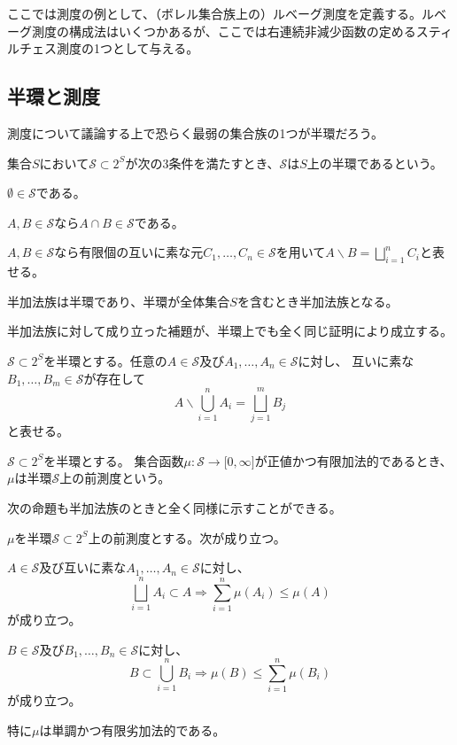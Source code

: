 \documentclass[../root.tex]{subfiles}
\begin{document}
ここでは測度の例として、（ボレル集合族上の）ルベーグ測度を定義する。ルベーグ測度の構成法はいくつかあるが、ここでは右連続非減少函数の定めるスティルチェス測度の1つとして与える。




\subsection{半環と測度}
測度について議論する上で恐らく最弱の集合族の1つが半環だろう。

\begin{Def}{}{}
集合$ S $において$ \mathscr{S}\subset 2^{S} $が次の3条件を満たすとき、$ \mathscr{S} $は$ S $上の半環であるという。
\begin{EnumCond}
\item $ \emptyset\in\mathscr{S} $である。
\item $ A, B\in\mathscr{S} $なら$ A\cap B\in\mathscr{S} $である。
\item $ A, B\in\mathscr{S} $なら有限個の互いに素な元$ C_{1}, \dotsc, C_{n}\in\mathscr{S} $を用いて$ A\backslash B=\bigsqcup_{i=1}^{n}C_{i} $と表せる。
\end{EnumCond}
\end{Def}

半加法族は半環であり、半環が全体集合$ S $を含むとき半加法族となる。

半加法族に対して成り立った補題が、半環上でも全く同じ証明により成立する。

\begin{Lem}{}{}
$ \mathscr{S}\subset 2^{S} $を半環とする。任意の$ A\in\mathscr{S} $及び$ A_{1}, \dotsc, A_{n}\in\mathscr{S} $に対し、
互いに素な$ B_{1}, \dotsc, B_{m}\in\mathscr{S} $が存在して
\[ A\backslash\bigcup_{i=1}^{n}A_{i}=\bigsqcup_{j=1}^{m}B_{j} \]
と表せる。
\end{Lem}

\begin{Def}{}{}
$ \mathscr{S}\subset 2^{S} $を半環とする。
集合函数$ \mu\colon\mathscr{S}\rightarrow\lbrack 0, \infty \rbrack $が正値かつ有限加法的であるとき、$ \mu $は半環$ \mathscr{S} $上の前測度という。
\end{Def}

次の命題も半加法族のときと全く同様に示すことができる。

\begin{Prop}{}{}
$ \mu $を半環$ \mathscr{S}\subset 2^{S} $上の前測度とする。次が成り立つ。
\begin{EnumCond}
\item $ A\in\mathscr{S} $及び互いに素な$ A_{1}, \dotsc, A_{n}\in\mathscr{S} $に対し、
\[ \bigsqcup_{i=1}^{n}A_{i}\subset A\Rightarrow\sum_{i=1}^{n}\mu( A_{i} )\le\mu( A ) \]
が成り立つ。
\item $ B\in\mathscr{S} $及び$ B_{1}, \dotsc, B_{n}\in\mathscr{S} $に対し、
\[ B\subset\bigcup_{i=1}^{n}B_{i}\Rightarrow\mu( B )\le\sum_{i=1}^{n}\mu( B_{i} ) \]
が成り立つ。
\end{EnumCond}

特に$ \mu $は単調かつ有限劣加法的である。
\end{Prop}
\end{document}
